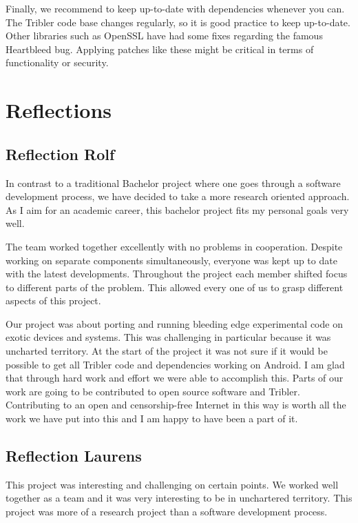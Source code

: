 		Finally, we recommend to keep up-to-date with dependencies whenever you can. The Tribler code base changes regularly, so it is good practice to keep up-to-date. Other libraries such as OpenSSL have had some fixes regarding the famous Heartbleed bug. Applying patches like these might be critical in terms of functionality or security.
		
	\section{Reflections}
	
		\subsection{Reflection Rolf}
			In contrast to a traditional Bachelor project where one goes through a software development process, we have decided to take a more research oriented approach. As I aim for an academic career, this bachelor project fits my personal goals very well.
		
			The team worked together excellently with no problems in cooperation. Despite working on separate components simultaneously, everyone was kept up to date with the latest developments. Throughout the project each member shifted focus to different parts of the problem. This allowed every one of us to grasp different aspects of this project.
		
			Our project was about porting and running bleeding edge experimental code on exotic devices and systems. This was challenging in particular because it was uncharted territory. At the start of the project it was not sure if it would be possible to get all Tribler code and dependencies working on Android. I am glad that through hard work and effort we were able to accomplish this. Parts of our work are going to be contributed to open source software and Tribler. Contributing to an open and censorship-free Internet in this way is worth all the work we have put into this and I am happy to have been a part of it.
		
		\subsection{Reflection Laurens}
			This project was interesting and challenging on certain points. We worked well together as a team and it was very interesting to be in unchartered territory. This project was more of a research project than a software development process.
			
